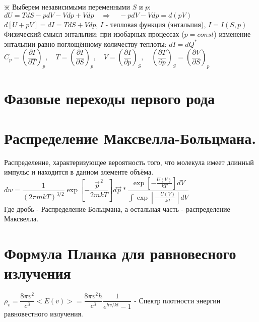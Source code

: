 \begin{multicols*}{2}
		$\divideontimes$ Выберем независимыми переменными $S$ и $p$:\\
		$dU = TdS - pdV - Vdp + Vdp \quad \Rightarrow \quad - pdV - Vdp = d(pV)$\\
		$d\left[U + pV\right] = dI = T dS + V dp$, \quad $I$ - тепловая функция (энтальпия), \quad $I = I(S, p)$\\
		Физический смысл энтальпии: при изобарных процессах ($p = const$) изменение энтальпии равно поглощённому количеству теплоты: $dI = dQ^*$\\
		$C_p = \left(\dfrac{\partial I}{\partial T}\right)_p, \quad T = \left(\dfrac{\partial I}{\partial S}\right)_p, \quad V = \left(\dfrac{\partial I}{\partial p}\right)_S, \quad \left(\dfrac{\partial T}{\partial p}\right)_S = \left(\dfrac{\partial V}{\partial S}\right)_p$\\

 
		\section{Фазовые переходы первого рода}

		\section{Распределение Максвелла-Больцмана.}
		Распределение, характеризующее вероятность того, что молекула имеет длинный импульс и находится в данном элементе объёма.\\
		$dw=\dfrac 1 {(2\pi mkT)^{3/2}}\exp\left[-\dfrac{\vec {p}^{\,2}}{2mkT}\right]d\vec p * \dfrac{\exp\left[-\frac{U(V)}{kT}\right]dV}{\int\exp\left[-\frac{U(V)}{kT}\right]dV}$ \\
		Где дробь - Распределение Больцмана, а остальная часть - распределение Максвелла.

		\section{Формула Планка для равновесного излучения}
		$\rho_v=\dfrac{8\pi v^2}{c^3}<E(v)>=\dfrac{8\pi v^2 h}{c^3}\dfrac{1}{e^{hv/kt}-1}$ - Спектр плотности энергии равновестного излучения.


\end{multicols*}
